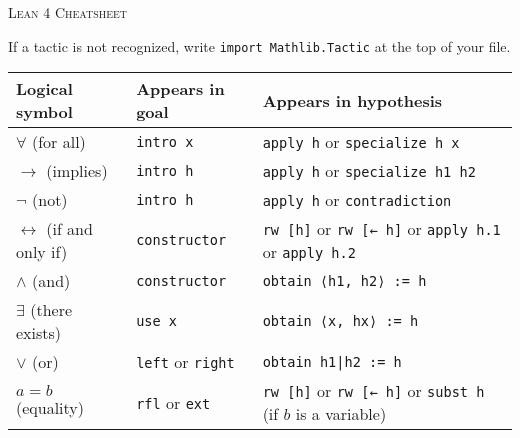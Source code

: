 \documentclass[a4paper]{article}
\newcommand{\lean}[1]{{\tt #1}}
\newcommand{\nv}{\textit{new\_name}\xspace}
\newcommand{\nom}{\textit{name}\xspace}
\newcommand{\expr}{\textit{expr}\xspace}
\begin{document}
\pagestyle{empty}
\begin{center}
 \large\textsc{Lean 4 Cheatsheet}
\end{center}


\begin{center}
If a tactic is not recognized, write \lean{import Mathlib.Tactic} at the top of your file.\smallskip
\setlength\tabcolsep{5mm}
\def\arraystretch{1.3}
\begin{tabular}{@{}lll@{}}
  \toprule
  Logical symbol & Appears in goal & Appears in hypothesis \\
  \midrule
  $\forall$ (for all) & \lean{intro x} & \lean{apply h} or \lean{specialize h x}  \\
  $\to$ (implies) & \lean{intro h} & \lean{apply h} or \lean{specialize h1 h2} \\
  $\neg$ (not) & \lean{intro h} & \lean{apply h} or \lean{contradiction}  \\
  $\leftrightarrow$ (if and only if)\qquad & \lean{constructor}  & \lean{rw [h]} or \lean{rw [← h]} or \lean{apply h.1} or \lean{apply h.2}\\
  $\wedge$ (and) & \lean{constructor} & \lean{obtain ⟨h1, h2⟩ := h} \\
  $\exists$ (there exists) & \lean{use x} & \lean{obtain ⟨x, hx⟩ := h} \\
  $\vee$ (or) & \lean{left} or \lean{right} & \lean{obtain h1|h2 := h} \\
  $ a = b$ (equality) & \lean{rfl} or \lean{ext} & \lean{rw [h]} or \lean{rw [← h]} or \lean{subst h} (if $b$ is a variable) \\
\bottomrule
\end{tabular}
\end{center}
\end{document}
